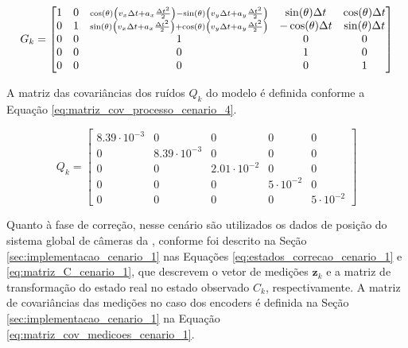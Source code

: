 \documentclass[acronym, symbols, table, deposito]{fei}
\begin{document}
			\renewcommand{\arraystretch}{1.2}
			\begin{equation}\label{eq:matriz_G_cenario_4}
				G_k = 
				\begin{bmatrix}
					1 & 0 & 
					\smash{\scriptstyle 
						\cos(\theta)\left( v_x \Delta t + a_x \frac{\Delta t^2}{2} \right) 
						- \sin(\theta)\left( v_y \Delta t + a_y \frac{\Delta t^2}{2} \right)} 
					& \sin(\theta) \Delta t 
					& \cos(\theta) \Delta t 
					\\
					0 & 1 & 
					\smash{\scriptstyle 
						\sin(\theta)\left( v_x \Delta t + a_x \frac{\Delta t^2}{2} \right) 
						+ \cos(\theta)\left( v_y \Delta t + a_y \frac{\Delta t^2}{2} \right)} 
					& -\cos(\theta) \Delta t 
					& \sin(\theta) \Delta t 
					\\
					0 & 0 & 1 & 0 & 0 \\
					0 & 0 & 0 & 1 & 0 \\
					0 & 0 & 0 & 0 & 1 \\
				\end{bmatrix}
			\end{equation}
		
			A matriz das covariâncias dos ruídos $Q_{k}$ do modelo é definida conforme a Equação \eqref{eq:matriz_cov_processo_cenario_4}.
		
			\begin{equation}\label{eq:matriz_cov_processo_cenario_4}
				Q_{k} = \begin{bmatrix}
					8.39\cdot10^{-3} & 0 & 0 & 0 & 0 \\
					0 & 8.39\cdot10^{-3} & 0 & 0 & 0 \\
					0 & 0 & 2.01\cdot10^{-2} & 0 & 0 \\
					0 & 0 & 0 & 5\cdot10^{-2} & 0 \\
					0 & 0 & 0 & 0 & 5\cdot10^{-2}
				\end{bmatrix}
			\end{equation}

			 Quanto à fase de correção, nesse cenário são utilizados os dados de posição do sistema global de câmeras da , conforme foi descrito na Seção \ref{sec:implementacao_cenario_1} nas Equações \eqref{eq:estados_correcao_cenario_1} e \eqref{eq:matriz_C_cenario_1}, que descrevem o vetor de medições $\textbf{z}_{k}$ e a matriz de transformação do estado real no estado observado $C_{k}$, respectivamente. A matriz de covariâncias das medições no caso dos encoders é definida na Seção \ref{sec:implementacao_cenario_1} na Equação \eqref{eq:matriz_cov_medicoes_cenario_1}.
		
\end{document}
